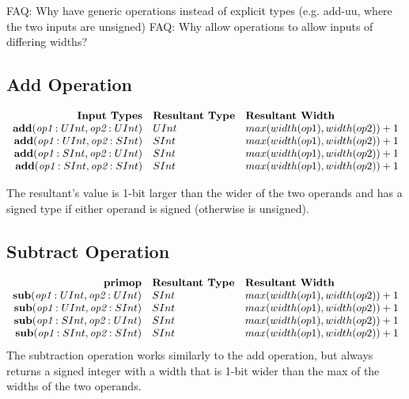 \documentclass[10pt]{article}
\begin{document}
FAQ: Why have generic operations instead of explicit types (e.g. add-uu, where the two inputs are unsigned)
FAQ: Why allow operations to allow inputs of differing widths?

\subsection{Add Operation}
\[
\begin{array}{rll}
\text{\bf Input Types} & \text{\bf Resultant Type} & \text{\bf Resultant Width} \\
\text{\bf add}(\text{\em op1}:UInt, \text{\em op2}:UInt) & UInt & max(width(op1),width(op2)) + 1 \\
\text{\bf add}(\text{\em op1}:UInt, \text{\em op2}:SInt) & SInt & max(width(op1),width(op2)) + 1 \\
\text{\bf add}(\text{\em op1}:SInt, \text{\em op2}:UInt) & SInt & max(width(op1),width(op2)) + 1 \\
\text{\bf add}(\text{\em op1}:SInt, \text{\em op2}:SInt) & SInt & max(width(op1),width(op2)) + 1 \\
\end{array}
\]

The resultant's value is 1-bit larger than the wider of the two operands and has a signed type if either operand is signed (otherwise is unsigned).

\subsection{Subtract Operation}
\[
\begin{array}{rll}
\text{\bf primop} & \text{\bf Resultant Type} & \text{\bf Resultant Width} \\
\text{\bf sub}(\text{\em op1}:UInt, \text{\em op2}:UInt) &  SInt & max(width(op1),width(op2)) + 1  \\
\text{\bf sub}(\text{\em op1}:UInt, \text{\em op2}:SInt) &  SInt & max(width(op1),width(op2)) + 1  \\
\text{\bf sub}(\text{\em op1}:SInt, \text{\em op2}:UInt) &  SInt & max(width(op1),width(op2)) + 1  \\
\text{\bf sub}(\text{\em op1}:SInt, \text{\em op2}:SInt) &  SInt & max(width(op1),width(op2)) + 1  \\
\end{array}
\]
The subtraction operation works similarly to the add operation, but always returns a signed integer with a width that is 1-bit wider than the max of the widths of the two operands.
\end{document}
